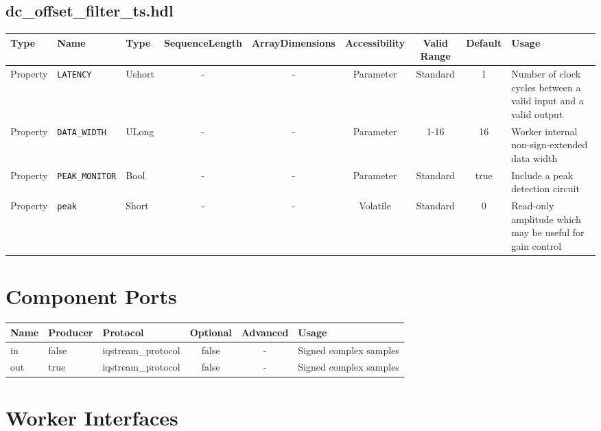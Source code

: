\documentclass{article}
\def\comp{dc\_offset\_filter\_ts}
\begin{document}
\begin{landscape}
\subsection*{\comp.hdl}
\begin{scriptsize}
	\begin{tabular}{|p{3cm}|p{2cm}|p{1cm}|c|c|c|c|c|p{5cm}|}
		\hline
		\rowcolor{blue}
		Type     & Name                  & Type  & SequenceLength & ArrayDimensions & Accessibility      & Valid Range & Default & Usage                                                    \\
		\hline
		Property & \verb+LATENCY+ 	  & Ushort& -              & -               & Parameter & Standard    & 1       & Number of clock cycles between a valid input and a valid output \\
		\hline
		Property & \verb+DATA_WIDTH+   & ULong & -              & -               & Parameter & 1-16        & 16      & Worker internal non-sign-extended data width             \\
		\hline
		Property & \verb+PEAK_MONITOR+ & Bool  & -              & -               & Parameter & Standard    & true    & Include a peak detection circuit                         \\
		\hline
		Property & \verb+peak+           & Short & -              & -               & Volatile           & Standard    & 0       & Read-only amplitude which may be useful for gain control \\
		\hline
	\end{tabular}
\end{scriptsize}

\section*{Component Ports}
\begin{scriptsize}
	\begin{tabular}{|M{2cm}|M{1.5cm}|M{4cm}|c|c|M{9cm}|}
		\hline
		Name & Producer & Protocol           & Optional & Advanced & Usage                  \\
		\hline
		in   & false    & iqstream\_protocol & false    & -        & Signed complex samples \\
		\hline
		out  & true     & iqstream\_protocol & false    & -        & Signed complex samples \\
		\hline
	\end{tabular}
\end{scriptsize}

\section*{Worker Interfaces}

\end{landscape}
\end{document}
